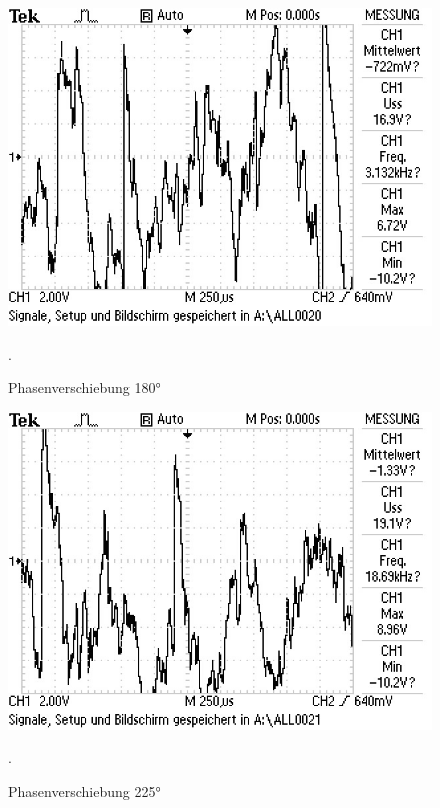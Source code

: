  \begin{figure}
   \centering
   \includegraphics[width=\textwidth]{bilder/Mit Rauschen/3.JPG}
 \caption{Phasenverschiebung 180°}.
   \label{fig:3}
 \end{figure}

 \begin{figure}
   \centering
   \includegraphics[width=\textwidth]{bilder/Mit Rauschen/4.JPG}
 \caption{Phasenverschiebung 225°}.
   \label{fig:4}
 \end{figure}

